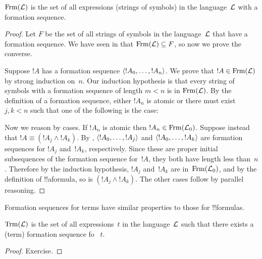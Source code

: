 \documentclass[../../../include/open-logic-section]{subfiles}
\begin{document}
\begin{thm}
$\Frm[L]$ is the set of all expressions (strings of symbols)
in the language~$\Lang L$ with a formation sequence.
\end{thm}

\begin{proof}
Let $F$ be the set of all strings of symbols in the language~$\Lang L$
that have a formation sequence. We have seen in
 that $\Frm[L] \subseteq F$, so now
we prove the converse.

Suppose $!A$ has a formation sequence $\langle !A_0,\dotsc,!A_n \rangle$.
We prove that $!A \in \Frm[L]$ by strong induction on~$n$.
Our induction hypothesis is that every string of symbols with a
formation sequence of length $m < n$ is in $\Frm[L]$.
By the definition of a formation sequence, either $!A_n$ is
atomic or there must exist $j,k < n$ such that one of the
following is the case:
\begin{enumerate}
\end{enumerate}
Now we reason by cases. If $!A_n$ is atomic then
$!A_n \in \Frm[L_0]$. Suppose instead that
$!A \equiv (!A_j \land !A_k)$. By 
,
$\langle !A_0,\dotsc,!A_j \rangle$ and $\langle !A_0,\dotsc,!A_k \rangle$ are
formation sequences for $!A_j$ and~$!A_k$, respectively. Since
these are proper initial subsequences of the formation sequence
for~$!A$, they both have length less than~$n$. Therefore by
the induction hypothesis, $!A_j$ and~$!A_k$ are in~$\Frm[L_0]$,
and by the definition of !!a{formula}, so is
$(!A_j \land !A_k)$. The other cases follow by parallel
reasoning.
\end{proof}

Formation sequences for terms have similar properties to those
for !!{formula}s.

\begin{prop}
$\Trm[L]$ is the set of all expressions~$t$ in the language~$\Lang L$
such that there exists a (term) formation sequence fo~ $t$.
\end{prop}

\begin{proof}
Exercise.
\end{proof}
\end{document}
